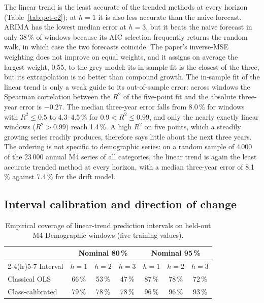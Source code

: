 The linear trend is the least accurate of the trended methods at every horizon (Table~\ref{tab:pet-e2}); at $h=1$ it is also less accurate than the naive forecast. ARIMA has the lowest median error at $h=3$, but it beats the naive forecast in only 38\,\% of windows because its AIC selection frequently returns the random walk, in which case the two forecasts coincide. The paper's inverse-MSE weighting does not improve on equal weights, and it assigns on average the largest weight, 0.55, to the grey model: its in-sample fit is the closest of the three, but its extrapolation is no better than compound growth. The in-sample fit of the linear trend is only a weak guide to its out-of-sample error: across windows the Spearman correlation between the $R^2$ of the five-point fit and the absolute three-year error is $-0.27$. The median three-year error falls from 8.0\,\% for windows with $R^2\le 0.5$ to 4.3--4.5\,\% for $0.9<R^2\le0.99$, and only the nearly exactly linear windows ($R^2>0.99$) reach 1.4\,\%. A high $R^2$ on five points, which a steadily growing series readily produces, therefore says little about the next three years. The ordering is not specific to demographic series: on a random sample of 4\,000 of the 23\,000 annual M4 series of all categories, the linear trend is again the least accurate trended method at every horizon, with a median three-year error of 8.1\,\% against 7.4\,\% for the drift model.

\subsection{Interval calibration and direction of change}

\begin{table}[htbp]\centering\small
\caption{Empirical coverage of linear-trend prediction intervals on held-out M4 Demographic windows (five training values).}\label{tab:pet-e3}
\begin{tabular}{lcccccc}\toprule
 & \multicolumn{3}{c}{Nominal 80\,\%} & \multicolumn{3}{c}{Nominal 95\,\%}\\\cmidrule(lr){2-4}\cmidrule(lr){5-7}
Interval & $h=1$ & $h=2$ & $h=3$ & $h=1$ & $h=2$ & $h=3$\\\midrule
Classical OLS & 66\,\% & 53\,\% & 47\,\% & 87\,\% & 78\,\% & 72\,\%\\
Class-calibrated & 79\,\% & 78\,\% & 78\,\% & 96\,\% & 96\,\% & 93\,\%\\\bottomrule
\end{tabular}
\end{table}

